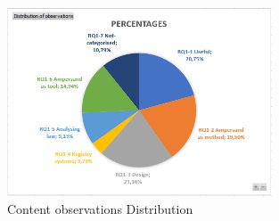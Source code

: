 



\begin{figure}[htp]
    \centering
    \includegraphics[width=0.7\textwidth]{docs/AF-SE/00_common/04_images/content_analysis.PNG}
    \caption{Content observations Distribution}
    \label{fig:content distribution}
\end{figure}

